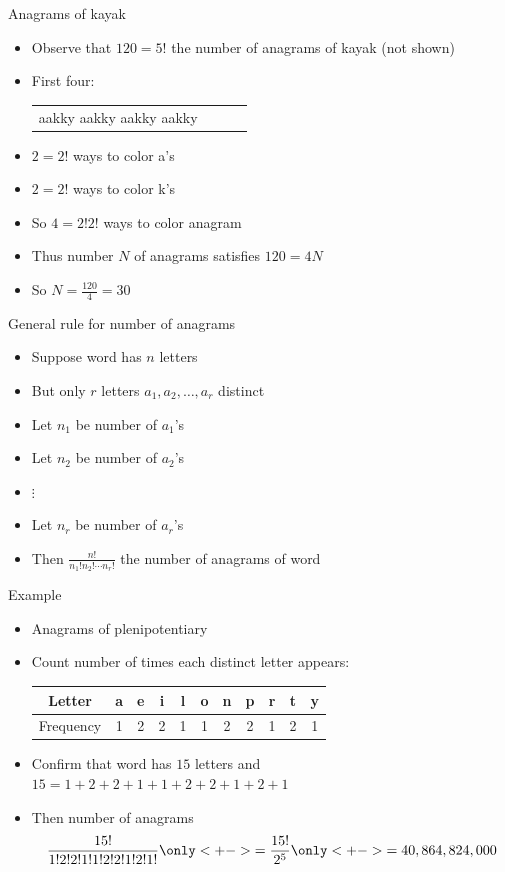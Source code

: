 \documentclass[handout]{beamer}
\theoremstyle{definition}
\begin{document}
\begin{frame}{Anagrams of kayak}
\begin{itemize}
\item Observe that $120=5!$ 
the number of anagrams of kay\alert{a}\alert{k} (not shown)
\item First four:
\begin{tabular}{cccc}
a\alert{a}k\alert{k}y
a\alert{a}\alert{k}ky
\alert{a}ak\alert{k}y
\alert{a}a\alert{k}ky
\end{tabular}
\item $2=2!$ ways to color a's
\item $2=2!$ ways to color k's
\item So $4=2!2!$ ways to color anagram
\item Thus number $N$ of anagrams satisfies
$120=4N$
\item So $N=\frac{120}{4}=30$
\end{itemize}
\end{frame}

\begin{frame}{General rule for number of anagrams}
\begin{itemize}
\item Suppose word has $n$ letters
\item But only $r$ letters $a_1,a_2,\ldots,a_r$ distinct 
\item Let $n_1$ be number of $a_1$'s
\item Let $n_2$ be number of $a_2$'s
\item $\vdots$
\item Let $n_r$ be number of $a_r$'s
\item Then $\frac{n!}{n_1!n_2!\cdots n_r!}$
the number of anagrams of word
\end{itemize}
\end{frame}

\begin{frame}{Example}
\begin{itemize}
\item Anagrams of \alert{plenipotentiary}
\item Count number of times each distinct letter appears:
\begin{tabular}{c|cccccccccc}
Letter&a&e&i&l&o&n&p&r&t&y\\\hline
Frequency&1&2&2&1&1&2&2&1&2&1
\end{tabular}
\item Confirm that word has $15$ letters and
$15=1+2+2+1+1+2+2+1+2+1$
\item Then number of anagrams
\[\frac{15!}{1!2!2!1!1!2!2!1!2!1!}
\only<+->{=\frac{15!}{2^5}}
\only<+->{=40,864,824,000}\]
\end{itemize}
\end{frame}
\end{document}

